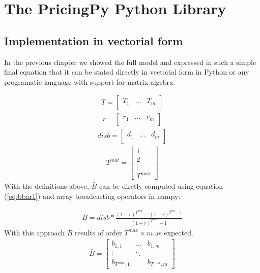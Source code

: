 

\chapter{The PricingPy Python Library}
\section{Implementation in vectorial form}
In the previous chapter we showed the full model and expressed in such a simple final equation that it can be stated directly in vectorial form in Python or any programatic language with support for matrix algebra.

\begin{align}
T = \begin{bmatrix} 
    T_{1} & \dots &  T_{m} \\
    \end{bmatrix}    
\end{align}
\begin{align}
r = \begin{bmatrix} 
    r_{1} & \dots &  r_{m} \\
    \end{bmatrix}    
\end{align}
\begin{align}
disb = \begin{bmatrix} 
    d_{1} & \dots &  d_{m} \\
    \end{bmatrix}    
\end{align}
\begin{align}
T^{mat} = \begin{bmatrix} 
     1  \\
     2  \\
    \vdots  \\
    T^{max} 
    \end{bmatrix}       
\end{align}
With the definitions above, $\bar{B}$ can be diretly computed using equation (\ref{eq:bbar1}) and array broadcasting operators in numpy:

\begin{align}
    \bar{B} = disb*\frac{(1+r)^{T^{max}}-(1+r)^{T^{mat}-1}}{(1+r)^{T^{max}}-1}
\end{align}
With this approach $\bar{B}$ results of order $T^{max}\times m$ as expected.
\begin{align}
\bar{B} = \begin{bmatrix} 
    b_{1,1} & \dots &  b_{1,m} \\
    \vdots & \ddots & \\
    b_{T^{max},1} &        & b_{T^{max},m} 
    \end{bmatrix}    
\end{align}

